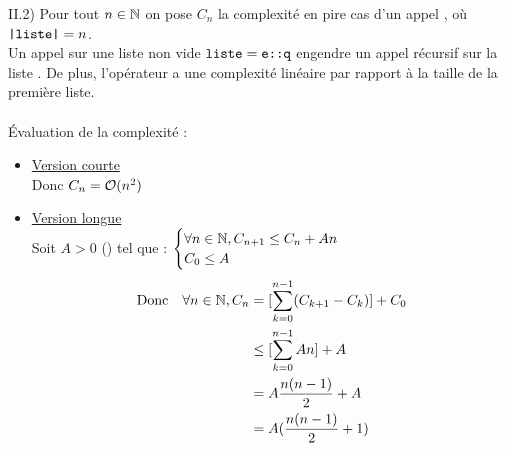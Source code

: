 \begin{question}{II.2) }{}
    Pour tout $n \in \mathbb{N}$ on pose $C_n$ la complexité en pire cas d'un appel , où $\texttt{|liste|} = n$. \\
    Un appel sur une liste non vide $\texttt{liste} = \texttt{e::q}$ engendre un appel récursif sur la liste . De plus, l'opérateur  a une complexité linéaire par rapport à la taille de la première liste. \\ \\ Évaluation de la complexité :\begin{itemize}
        \item \underline{Version courte} \\ Donc $C_n = \mathcal{O}(n^2)$
        \item \underline{Version longue} \\ Soit $A > 0$ () tel que : $\begin{cases}
            \forall n \in \mathbb{N}, C_{n+1} \leq C_n + An \\
            C_0 \leq A
        \end{cases}$
        \begin{align*}
            \text{Donc} \quad \forall n \in \mathbb{N}, C_n &= [\sum_{k=0}^{n-1}(C_{k+1}-C_k)] + C_0 \\
            &\leq [\sum_{k=0}^{n-1}An] + A \\
            &= A \frac{n(n-1)}{2} + A \\
            &= A(\frac{n(n-1)}{2} + 1) 
        \end{align*}
    \end{itemize}
\end{question}

